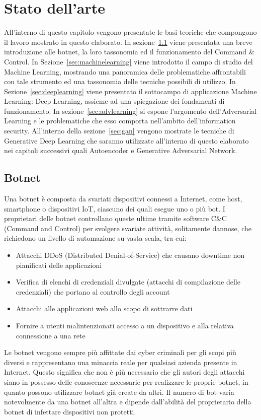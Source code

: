 \chapter{Stato dell'arte}
\label{statodellarte}
All'interno di questo capitolo vengono presentate le basi teoriche che compongono il lavoro mostrato in questo elaborato. In sezione~\ref{sec:botnet} viene presentata una breve introduzione alle botnet, la loro tassonomia ed il funzionamento del Command \& Control. In Sezione~\ref{sec:machinelearning} viene introdotto il campo di studio del Machine Learning, mostrando una panoramica delle problematiche affrontabili con tale strumento ed una tassonomia delle tecniche possibili di utilizzo. In Sezione~\ref{sec:deeplearning} viene presentato il sottocampo di applicazione Machine Learning: Deep Learning, assieme ad una spiegazione dei fondamenti di funzionamento.
In sezione~\ref{sec:advlearning} si espone l'argomento dell'Adversarial Learning e le problematiche che esso comporta nell'ambito dell'information security. 
All'interno della sezione~\ref{sec:gan} vengono mostrate le tecniche di Generative Deep Learning che saranno utilizzate all'interno di questo elaborato nei capitoli successivi quali Autoencoder e Generative Adversarial Network.

\newpage
\section{Botnet}
\label{sec:botnet}
Una botnet è composta da svariati dispositivi connessi a Internet, come host, smartphone o dispositivi IoT, ciascuno dei quali esegue uno o più bot. I proprietari delle botnet controllano queste ultime tramite software C\&C (Command and Control) per svolgere svariate attività, solitamente dannose, che richiedono un livello di automazione su vasta scala, tra cui:
\begin{itemize}
\item Attacchi DDoS (Distributed Denial-of-Service) che causano downtime non pianificati delle applicazioni
\item Verifica di elenchi di credenziali divulgate (attacchi di compilazione delle credenziali) che portano al controllo degli account
\item Attacchi alle applicazioni web allo scopo di sottrarre dati
\item Fornire a utenti malintenzionati accesso a un dispositivo e alla relativa connessione a una rete
\end{itemize}

Le botnet vengono sempre più affittate dai cyber criminali per gli scopi più diversi e rappresentano una minaccia reale per qualsiasi azienda presente in Internet. Questo significa che non è più necessario che gli autori degli attacchi siano in possesso delle conoscenze necessarie per realizzare le proprie botnet, in quanto possono utilizzare botnet già create da altri. Il numero di bot varia notevolmente da una botnet all'altra e dipende dall'abilità del proprietario della botnet di infettare dispositivi non protetti. 

